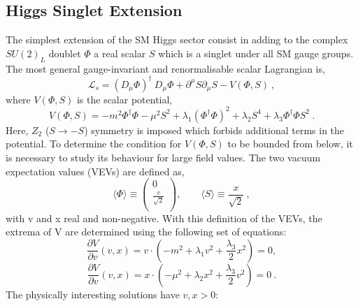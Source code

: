 \subsection*{Higgs Singlet Extension}
The simplest extension of the SM Higgs sector consist in adding to the complex $SU(2)_L$ doublet $\Phi$ a real scalar  $S$ which is a singlet under all SM gauge groups.  The most general gauge-invariant and renormalisable scalar Lagrangian is,
\newline
\begin{equation}
 \mathcal{L}_s = (D_{\mu} \Phi )^{\dagger}  \: D_{\mu} \Phi  +  \partial^{\mu}S   \partial_{\mu}S -V(\Phi, S)   \: ,  \end{equation}
\newline
where $V(\Phi, S) $ is the scalar potential,  
\newline
\begin{equation}
 V(\Phi, S)= -m^2   \Phi ^{\dagger}\Phi -\mu^2 S^2 +\lambda_1 (\Phi ^{\dagger}\Phi)^2 +\lambda_2 S^4 + \lambda_3 \Phi ^{\dagger}\Phi S^2 \: . \end{equation}
\newline
Here, $Z_2$ ($S \rightarrow -S$) symmetry is imposed which forbids additional terms in the potential.
To determine the condition for $V(\Phi, S)$ to be bounded from below, it is necessary to study its behaviour for large field values.
The two vacuum expectation values (VEVs) are defined as,
\begin{equation}
\langle \Phi \rangle \equiv \left(
\begin{array}{c}
0  \\
\frac{v }{\sqrt{2}}  \\
\end{array}
\right)
, \qquad 
\langle S \rangle \equiv \frac{x }{\sqrt{2}}  \:,  \end{equation}
with v and x real and non-negative.
With this definition of the VEVs, the extrema of V are determined using the following set of equations: 
\newline
\begin{equation}
\frac{\partial V}{\partial v}(v,x)= v \cdot (-m^2+ \lambda_1 v^2+ \frac{\lambda_3}{2}x^2 )=0 , \end{equation}
\begin{equation}
\frac{\partial V}{\partial v}(v,x)= x \cdot (-\mu^2+ \lambda_2 x^2+ \frac{\lambda_3}{2}v^2 )=0 \: . \end{equation}
\newline
The physically interesting solutions have $v,x>0$:
